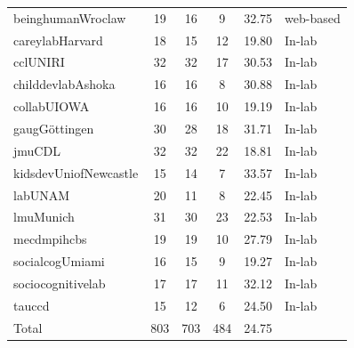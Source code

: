 \documentclass[
  english,
  man,floatsintext]{apa6}
\begin{document}
\begin{center}
\begin{ThreePartTable}
{\begin{longtable}{lccccl}
beinghumanWroclaw & 19 & 16 & 9 & 32.75 & web-based\\
careylabHarvard & 18 & 15 & 12 & 19.80 & In-lab\\
cclUNIRI & 32 & 32 & 17 & 30.53 & In-lab\\
childdevlabAshoka & 16 & 16 & 8 & 30.88 & In-lab\\
collabUIOWA & 16 & 16 & 10 & 19.19 & In-lab\\
gaugGöttingen & 30 & 28 & 18 & 31.71 & In-lab\\
jmuCDL & 32 & 32 & 22 & 18.81 & In-lab\\
kidsdevUniofNewcastle & 15 & 14 & 7 & 33.57 & In-lab\\
labUNAM & 20 & 11 & 8 & 22.45 & In-lab\\
lmuMunich & 31 & 30 & 23 & 22.53 & In-lab\\
mecdmpihcbs & 19 & 19 & 10 & 27.79 & In-lab\\
socialcogUmiami & 16 & 15 & 9 & 19.27 & In-lab\\
sociocognitivelab & 17 & 17 & 11 & 32.12 & In-lab\\
tauccd & 15 & 12 & 6 & 24.50 & In-lab\\
Total & 803 & 703 & 484 & 24.75 & \\
\bottomrule
\end{longtable}

}

\end{ThreePartTable}
\end{center}
\end{document}
